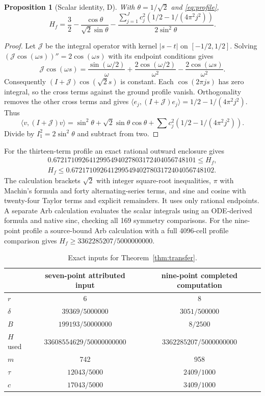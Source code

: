 \documentclass[11pt]{article}
\newtheorem{proposition}[theorem]{Proposition}
\theoremstyle{remark}\newtheorem{remark}[theorem]{Remark}
\begin{document}
\begin{proposition}[Scalar identity, D]\label{prop:scalar}
With $\theta=1/\sqrt2$ and \eqref{eq:profile},
\begin{equation}\label{eq:hformula}
 H_f=\frac32-\frac{\cos\theta}{\sqrt2\sin\theta}
 -\frac{\sum_{j=1}^Jc_j^2(1/2-1/(4\pi^2j^2))}{2\sin^2\theta}.
\end{equation}
\end{proposition}
\begin{proof}
Let $\mathcal J$ be the integral operator with kernel $|s-t|$ on
$[-1/2,1/2]$. Solving $(\mathcal J\cos(\omega s))''=2\cos(\omega s)$
with its endpoint conditions gives
\[
 \mathcal J\cos(\omega s)=\frac{\sin(\omega/2)}{\omega}
 +\frac{2\cos(\omega/2)}{\omega^2}
 -\frac{2\cos(\omega s)}{\omega^2}.
\]
Consequently $(I+\mathcal J)\cos(\sqrt2 s)$ is constant. Each
$\cos(2\pi js)$ has zero integral, so the cross terms against the
ground profile vanish. Orthogonality removes the other cross terms and gives
$\langle e_j,(I+\mathcal J)e_j\rangle=1/2-1/(4\pi^2j^2)$.
Thus
\[
 \langle v,(I+\mathcal J)v\rangle
 =\sin^2\theta+\sqrt2\sin\theta\cos\theta+
 \sum c_j^2(1/2-1/(4\pi^2j^2)).
\]
Divide by $I_1^2=2\sin^2\theta$ and subtract from two.
\end{proof}

For the thirteen-term profile an exact rational outward enclosure gives
\begin{gather*}
 0.6721710926412995494027803172404056748101\le H_f,\\
 H_f\le0.6721710926412995494027803172404056748102.
\end{gather*}
The calculation brackets $\sqrt2$ with integer square-root inequalities,
$\pi$ with Machin's formula and forty alternating-series terms, and sine
and cosine with twenty-four Taylor terms and explicit remainders. It uses
only rational endpoints. A separate Arb calculation evaluates the scalar
integrals using an ODE-derived formula and native sinc, checking all 169
symmetry comparisons. For the nine-point profile a source-bound Arb
calculation with a full 4096-cell profile comparison gives
$H_f\ge3362285207/5000000000$.

\begin{table}[htbp]\centering\small
\begin{tabular}{lcc}\toprule
 & seven-point attributed input & nine-point completed computation\\\midrule
$r$ & 6 & 8\\
$\delta$ & $39369/5000000$ & $3051/500000$\\
$B$ & $199193/50000000$ & $8/2500$\\
$H$ used & $33608554629/50000000000$ & $3362285207/5000000000$\\
$m$ & 742 & 958\\
$\tau$ & $12043/5000$ & $2409/1000$\\
$c$ & $17043/5000$ & $3409/1000$\\\bottomrule
\end{tabular}
\caption{Exact inputs for Theorem~\ref{thm:transfer}.}\label{tab:parameters}
\end{table}
\end{document}
